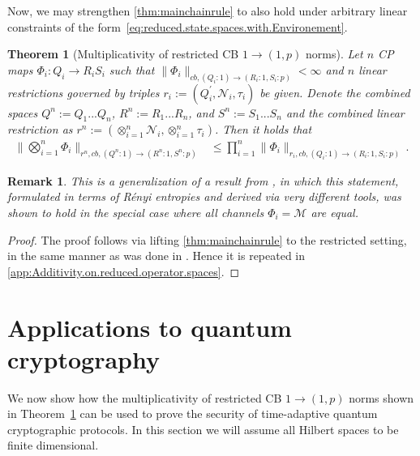 \documentclass[11pt]{article}
\newcommand{\1}{\ensuremath{\mathbbm{1}}}
\theoremstyle{newdefinition}
\theoremstyle{newplain}
\newtheorem{theorem}[definition]{Theorem}
\newtheorem{remark}[definition]{Remark}
\theoremstyle{myplain}
\begin{document}
Now, we may strengthen \cref{thm:mainchainrule} to also hold under arbitrary linear constraints of the form~\eqref{eq:reduced.state.spaces.with.Environement}. 

\begin{theorem}[Multiplicativity of restricted CB $1\to (1,p)$ norms]\label{thm:Restricted.multiplicativity}
Let $n$ CP maps $\Phi_i:Q_i\to R_iS_i$ such that $\|\Phi_i\|_{cb,(Q_i:1)\to(R_i:1,S_i:p)}<\infty$ and $n$ linear restrictions governed by triples $r_i:=(Q_i^\prime,\mathcal{N}_i,\tau_i)$ be given. Denote the combined spaces $Q^n:=Q_1...Q_n$, $R^n:=R_1...R_n$, and $S^n:=S_1...S_n$ and the combined linear restriction as $r^n:=(\otimes_{i=1}^n\mathcal{N}_i,\otimes_{i=1}^n\tau_i)$.
Then it holds that
    \begin{align}
        \label{eq:multiplicativity.1to1P}
        \bigg\| \bigotimes_{i=1}^n \Phi_i\bigg\|_{r^n,cb,(Q^n:1)\to (R^n:1,S^n:p)} 
            &\leq \prod^n_{i=1} \| \Phi_i\|_{r_i,cb,(Q_i:1)\to (R_i:1,S_i:p)}\,.
    \end{align}
\end{theorem}
\begin{remark} This is a generalization of a result from \cite{Himbeeck.2025}, in which this statement, formulated in terms of Rényi entropies and derived via very different tools, was shown to hold in the special case where all channels $\Phi_i=\mathcal{M}$ are equal.
\end{remark}
\begin{proof} 
The proof follows via lifting \cref{thm:mainchainrule} to the restricted setting, in the same manner as was done in \cite{Himbeeck.2025}. Hence it is repeated in \cref{app:Additivity.on.reduced.operator.spaces}.
\end{proof}


\section{Applications to quantum cryptography}
\label{sec:Applications.QKD}


We now show how the multiplicativity of restricted CB $1\to (1,p)$ norms shown in Theorem~\ref{thm:Restricted.multiplicativity} can be used to prove the security of time-adaptive quantum cryptographic protocols. In this section we will assume all Hilbert spaces to be finite dimensional.
\end{document}
